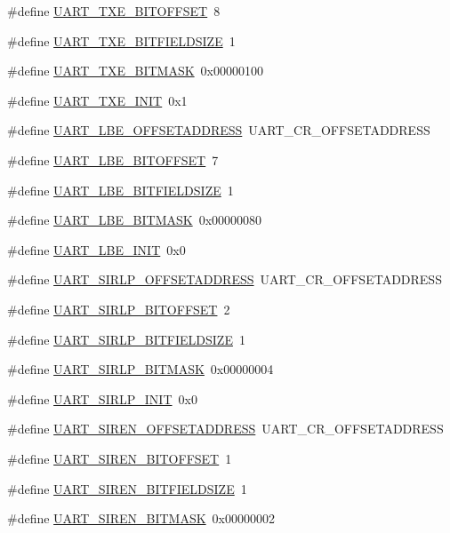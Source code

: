 \begin{DoxyCompactItemize}
\item 
\#define \hyperlink{a00575_a237ba9314dfa95cd248222e883a8a968}{UART\_\-TXE\_\-BITOFFSET}~8
\item 
\#define \hyperlink{a00575_a39d36540ed2feb69dc4e46cc5fe62117}{UART\_\-TXE\_\-BITFIELDSIZE}~1
\item 
\#define \hyperlink{a00575_a039a93f5e3da93c07a63918f4635f7a7}{UART\_\-TXE\_\-BITMASK}~0x00000100
\item 
\#define \hyperlink{a00575_aec4c902443bce23f9aeb5d37173c30a1}{UART\_\-TXE\_\-INIT}~0x1
\item 
\#define \hyperlink{a00575_ae1924da42212263089a643b5546242b9}{UART\_\-LBE\_\-OFFSETADDRESS}~UART\_\-CR\_\-OFFSETADDRESS
\item 
\#define \hyperlink{a00575_a9be31150888552283bd8e6872b77d396}{UART\_\-LBE\_\-BITOFFSET}~7
\item 
\#define \hyperlink{a00575_ac57fd32b382e46ba721cafd18c8b95cb}{UART\_\-LBE\_\-BITFIELDSIZE}~1
\item 
\#define \hyperlink{a00575_a4e6f79be4c150fd0f150b70096f4131a}{UART\_\-LBE\_\-BITMASK}~0x00000080
\item 
\#define \hyperlink{a00575_ac2cc7ae3e4e933bb1e826c862fcce98f}{UART\_\-LBE\_\-INIT}~0x0
\item 
\#define \hyperlink{a00575_a67249bf8b3013738ca1328a51fc5f47a}{UART\_\-SIRLP\_\-OFFSETADDRESS}~UART\_\-CR\_\-OFFSETADDRESS
\item 
\#define \hyperlink{a00575_aa80117bfee580e8c56c2321dceb19725}{UART\_\-SIRLP\_\-BITOFFSET}~2
\item 
\#define \hyperlink{a00575_acffafe5b41b0c0fc42411874002890b3}{UART\_\-SIRLP\_\-BITFIELDSIZE}~1
\item 
\#define \hyperlink{a00575_a10e76a0ad44d3d0bc4fe73fafa6b0fe6}{UART\_\-SIRLP\_\-BITMASK}~0x00000004
\item 
\#define \hyperlink{a00575_a58515313d551fff51ac2f4746edc3355}{UART\_\-SIRLP\_\-INIT}~0x0
\item 
\#define \hyperlink{a00575_a94e4e72847e92a8efdaf2461ed9ab22f}{UART\_\-SIREN\_\-OFFSETADDRESS}~UART\_\-CR\_\-OFFSETADDRESS
\item 
\#define \hyperlink{a00575_a4991aebf1844c5d474e79346d5ad292f}{UART\_\-SIREN\_\-BITOFFSET}~1
\item 
\#define \hyperlink{a00575_aad3b5fd94f847cf193cc2b1ccf0f8233}{UART\_\-SIREN\_\-BITFIELDSIZE}~1
\item 
\#define \hyperlink{a00575_a112e0bf30867edb9556dc3d42c2c308f}{UART\_\-SIREN\_\-BITMASK}~0x00000002

\end{DoxyCompactItemize}
